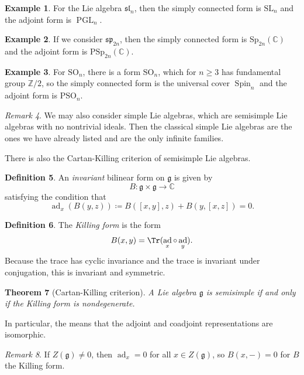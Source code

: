 \documentclass{amsart}
\newtheorem{thm}{Theorem}[section]
\theoremstyle{definition}
\newtheorem{defn}[thm]{Definition}
\newtheorem{exm}[thm]{Example}
\theoremstyle{remark}
\newtheorem{rmk}[thm]{Remark}
\theoremstyle{plain}
\theoremstyle{definition}
\theoremstyle{remark}
\newcommand{\C}{\mathbb{C}}
\newcommand{\Z}{\mathbb{Z}}
\newcommand{\g}{\mathfrak{g}}
\newcommand{\mf}[1]{\mathfrak{#1}}
\newcommand{\mr}[1]{\mathrm{#1}}
\newcommand{\on}[1]{\operatorname{#1}}
\newcommand{\1}{\mathbf{1}}
\newcommand{\2}{\mathbf{2}}
\newcommand{\3}{\mathbf{3}}
\newcommand{\SL}{\mr{SL}}
\newcommand{\SO}{\mr{SO}}
\newcommand{\Sp}{\mr{Sp}}
\renewcommand{\sl}{\mf{sl}}
\renewcommand{\sp}{\mf{sp}}
\DeclareMathOperator{\ad}{ad}
\begin{document}
\begin{exm}
    For the Lie algebra \(\sl_n\), then the simply connected form is \(\SL_n\) and the adjoint form is \(\on{PGL}_n\).
\end{exm}

\begin{exm}
    If we consider \(\sp_{2n}\), then the simply connected form is \(\Sp_{2n}(\C)\) and the adjoint form is \(\mr{P}\Sp_{2n}(\C)\).
\end{exm}

\begin{exm}
    For \(\SO_n\), there is a form \(\SO_n\), which for \(n \geq 3\) has fundamental group \(\Z/2\), so the simply connected form is the universal cover \(\on{Spin}_n\) and the adjoint form is \(\mr{P}\SO_n\).
\end{exm}

\begin{rmk}
    We may also consider simple Lie algebras, which are semisimple Lie algebras with no nontrivial ideals. Then the classical simple Lie algebras are the ones we have already listed and are the only infinite families.
\end{rmk}

There is also the Cartan-Killing criterion of semisimple Lie algebras.
\begin{defn}
    An \textit{invariant} bilinear form on \(\g\) is given by
    \[ B \colon \g \times \g \to \C \]
    satisfying the condition that 
    \[ \ad_x (B(y,z)) \coloneqq B([x,y], z) + B(y, [x,z]) = 0. \]
\end{defn}

\begin{defn}
    The \textit{Killing form} is the form
    \[ B(x,y) = \Tr (\ad_x \circ \ad_y). \]
    Because the trace has cyclic invariance and the trace is invariant under conjugation, this is invariant and symmetric.
\end{defn}

\begin{thm}[Cartan-Killing criterion]
    A Lie algebra \(\g\) is semisimple if and only if the Killing form is nondegenerate.
\end{thm}

In particular, the means that the adjoint and coadjoint representations are isomorphic.

\begin{rmk}
    If \(Z(\g) \neq 0\), then \(\ad_x = 0\) for all \(x \in Z(\g)\), so \(B(x, -) = 0\) for \(B\) the Killing form.
\end{rmk}
\end{document}
